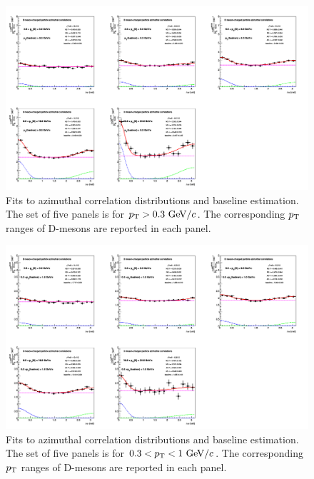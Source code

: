 \begin{figure}[h]
\centering
\includegraphics[width=0.99\linewidth, height=0.70\linewidth,angle=270]{figures/Fits/cFitting_0_pthad0dot3to99dot0.png}
\caption{Fits to azimuthal correlation distributions and baseline estimation. The set of five panels is for $p_{\rm T}>0.3~\mathrm{GeV}/c$. The corresponding $p_{\rm T}$ ranges of D-mesons are reported in each panel.}
\label{fig:StdFit1}
\end{figure}
\begin{figure}[h]
\centering
\includegraphics[width=0.99\linewidth, height=0.70\linewidth,angle=270]{figures/Fits/cFitting_0_pthad0dot3to1dot.png}
\caption{Fits to azimuthal correlation distributions and baseline estimation. The set of five panels is for $0.3<p_{\rm T}<1~\mathrm{GeV}/c$. The corresponding $p_{\rm T}$ ranges of D-mesons are reported in each panel.}
\label{fig:StdFit2}
\end{figure}
